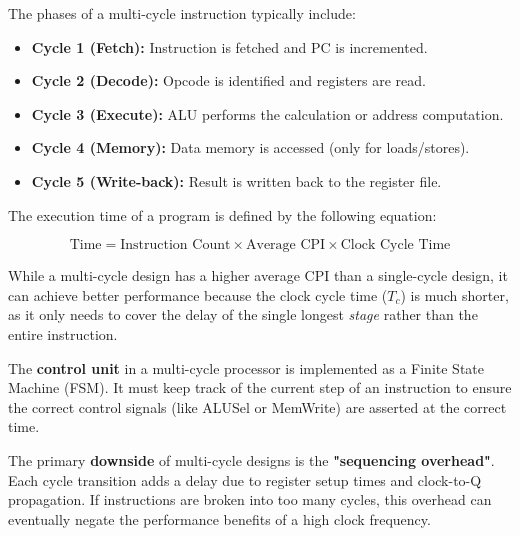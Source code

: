 \begin{example}
	The phases of a multi-cycle instruction typically include:
	\begin{itemize}
		\item \textbf{Cycle 1 (Fetch):} Instruction is fetched and PC is incremented.
		\item \textbf{Cycle 2 (Decode):} Opcode is identified and registers are read.
		\item \textbf{Cycle 3 (Execute):} ALU performs the calculation or address computation.
		\item \textbf{Cycle 4 (Memory):} Data memory is accessed (only for loads/stores).
		\item \textbf{Cycle 5 (Write-back):} Result is written back to the register file.
	\end{itemize}
\end{example}

\begin{theorem}
	The execution time of a program is defined by the following equation:

	$$\text{Time} = \text{Instruction Count} \times \text{Average CPI} \times \text{Clock Cycle Time}$$

	While a multi-cycle design has a higher average CPI than a single-cycle design, it can achieve better performance because the clock cycle time ($T_c$) is much shorter, as it only needs to cover the delay of the single longest \textit{stage} rather than the entire instruction.
\end{theorem}

\begin{remark}
	The \textbf{control unit} in a multi-cycle processor is implemented as a Finite State Machine (FSM). It must keep track of the current step of an instruction to ensure the correct control signals (like ALUSel or MemWrite) are asserted at the correct time.
\end{remark}

\begin{lemma}
	The primary \textbf{downside} of multi-cycle designs is the \textbf{"sequencing overhead"}. Each cycle transition adds a delay due to register setup times and clock-to-Q propagation. If instructions are broken into too many cycles, this overhead can eventually negate the performance benefits of a high clock frequency.
\end{lemma}